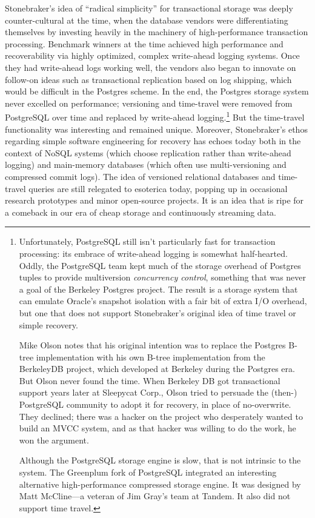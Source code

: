 \documentclass[sigconf,natbib=false]{acmart}
\begin{document}
Stonebraker's idea of ``radical simplicity'' for transactional storage was deeply counter-cultural at the time, when the database vendors were differentiating themselves by investing heavily in the machinery of high-performance transaction processing. Benchmark winners at the time achieved high performance and recoverability via highly optimized, complex write-ahead logging systems. Once they had write-ahead logs working well, the vendors also began to innovate on follow-on ideas such as transactional replication based on log shipping, which would be difficult in the Postgres scheme. In the end, the Postgres storage system never excelled on performance; versioning and time-travel were removed from PostgreSQL over time and replaced by write-ahead logging.\footnote{Unfortunately, PostgreSQL still isn't particularly fast for transaction processing: its embrace of write-ahead logging is somewhat half-hearted. Oddly, the PostgreSQL team kept much of the storage overhead of Postgres tuples to provide multiversion \textit{concurrency control}, something that was never a goal of the Berkeley Postgres project. The result is a storage system that can emulate Oracle's snapshot isolation with a fair bit of extra I/O overhead, but one that does not support Stonebraker's original idea of time travel or simple recovery. 



Mike Olson notes that his original intention was to replace the Postgres B-tree implementation with his own B-tree implementation from the BerkeleyDB project, which developed at Berkeley during the Postgres era. But Olson never found the time. When Berkeley DB got transactional support years later at Sleepycat Corp., Olson tried to persuade the (then-) PostgreSQL community to adopt it for recovery, in place of no-overwrite. They declined; there was a hacker on the project who desperately wanted to build an MVCC system, and as that hacker was willing to do the work, he won the argument.



Although the PostgreSQL storage engine is slow, that is not intrinsic to the system. The Greenplum fork of PostgreSQL integrated an interesting alternative high-performance compressed storage engine. It was designed by Matt McCline---a veteran of Jim Gray's team at Tandem. It also did not support time travel.} But the time-travel functionality was interesting and remained unique. Moreover, Stonebraker's ethos regarding simple software engineering for recovery has echoes today both in the context of NoSQL systems (which choose replication rather than write-ahead logging) and main-memory databases (which often use multi-versioning and compressed commit logs).  The idea of versioned relational databases and time-travel queries are still relegated to esoterica today, popping up in occasional research prototypes and minor open-source projects. It is an idea that is ripe for a comeback in our era of cheap storage and continuously streaming data.
\end{document}
